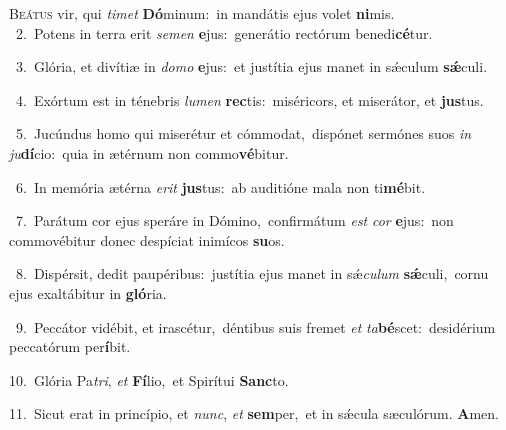 \lettrine{\initial\textcolor{\initialcolor}{B}}{eátus} vir, qui \textit{ti}\-\textit{met} \textbf{Dó}\-minum:~\star in mandátis ejus volet \textbf{ni}\-mis.\\
{\numbfont\textcolor{\numbcolor}{~2.}}~Potens in terra erit \textit{se}\-\textit{men} \textbf{e}\-jus:~\star generátio rectórum benedi\-\textbf{cé}\-tur.\par
{\numbfont\textcolor{\numbcolor}{~3.}}~Glória, et divítiæ in \textit{do}\-\textit{mo} \textbf{e}\-jus:~\star et justítia ejus manet in sǽculum \textbf{sǽ}\-culi.\par
{\numbfont\textcolor{\numbcolor}{~4.}}~Exórtum est in ténebris \textit{lu}\-\textit{men} \textbf{rec}\-tis:~\star miséricors, et miserátor, et \textbf{jus}\-tus.\par
{\numbfont\textcolor{\numbcolor}{~5.}}~Jucúndus homo qui miserétur et cómmodat,~\dagger dispónet sermónes suos \textit{in} \textit{ju}\-\textbf{dí}cio:~\star quia in ætérnum non commo\-\textbf{vé}\-bitur.\par
{\numbfont\textcolor{\numbcolor}{~6.}}~In memória ætérna \textit{e}\-\textit{rit} \textbf{jus}\-tus:~\star ab auditióne mala non ti\-\textbf{mé}\-bit.\par
{\numbfont\textcolor{\numbcolor}{~7.}}~Parátum cor ejus speráre in Dómino,~\dagger confirmátum \textit{est} \textit{cor} \textbf{e}\-jus:~\star non commovébitur donec despíciat inimícos \textbf{su}\-os.\par
{\numbfont\textcolor{\numbcolor}{~8.}}~Dispérsit, dedit paupéribus:~\dagger justítia ejus manet in sǽ\-\textit{cu}\-\textit{lum} \textbf{sǽ}\-culi,~\star cornu ejus exaltábitur in \textbf{gló}\-ria.\par
{\numbfont\textcolor{\numbcolor}{~9.}}~Peccátor vidébit, et irascétur,~\dagger déntibus suis fremet \textit{et} \textit{ta}\-\textbf{bé}scet:~\star desidérium peccatórum per\-\textbf{í}\-bit.\par
{\numbfont\textcolor{\numbcolor}{10.}}~Glória Pa\-\textit{tri}\-, \textit{et} \textbf{Fí}\-lio,~\star et Spirítui \textbf{Sanc}\-to.\par
{\numbfont\textcolor{\numbcolor}{11.}}~Sicut erat in princípio, et \textit{nunc}\-, \textit{et} \textbf{sem}\-per,~\star et in sǽcula sæculórum. \textbf{A}\-men.\par
